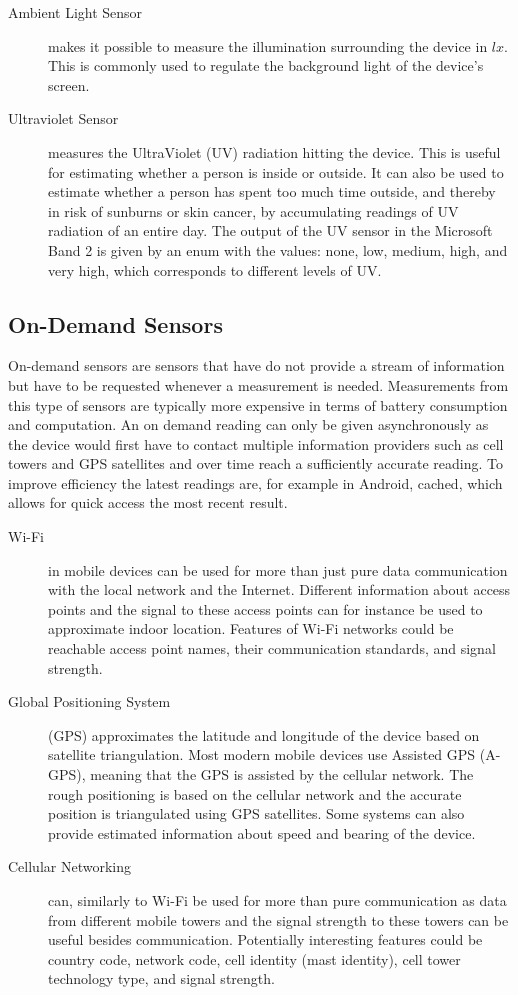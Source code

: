 \begin{description}
    \item[Ambient Light Sensor] makes it possible to measure the illumination surrounding the device in $lx$. This is commonly used to regulate the background light of the device's screen.
    \item[Ultraviolet Sensor] measures the UltraViolet (UV) radiation hitting the device. This is useful for estimating whether a person is inside or outside. It can also be used to estimate whether a person has spent too much time outside, and thereby in risk of sunburns or skin cancer, by accumulating readings of UV radiation of an entire day. The output of the UV sensor in the Microsoft Band 2 is given by an enum with the values: none, low, medium, high, and very high, which corresponds to different levels of UV. 
\end{description}

\subsection{On-Demand Sensors}
On-demand sensors are sensors that have do not provide a stream of information but have to be requested whenever a measurement is needed. Measurements from this type of sensors are typically more expensive in terms of battery consumption and computation. An on demand reading can only be given asynchronously as the device would first have to contact multiple information providers such as cell towers and GPS satellites and over time reach a sufficiently accurate reading. To improve efficiency the latest readings are, for example in Android, cached, which allows for quick access the most recent result.

\begin{description}
    \item[Wi-Fi] in mobile devices can be used for more than just pure data communication with the local network and the Internet. Different information about access points and the signal to these access points can for instance be used to approximate indoor location. Features of Wi-Fi networks could be reachable access point names, their communication standards, and signal strength. 
    \item[Global Positioning System] (GPS) approximates the latitude and longitude of the device based on satellite triangulation. Most modern mobile devices use Assisted GPS (A-GPS), meaning that the GPS is assisted by the cellular network. The rough positioning is based on the cellular network and the accurate position is triangulated using GPS satellites. Some systems can also provide estimated information about speed and bearing of the device.
    \item[Cellular Networking] can, similarly to Wi-Fi be used for more than pure communication as data from different mobile towers and the signal strength to these towers can be useful besides communication. Potentially interesting features could be country code, network code, cell identity (mast identity), cell tower technology type, and signal strength.
\end{description}

